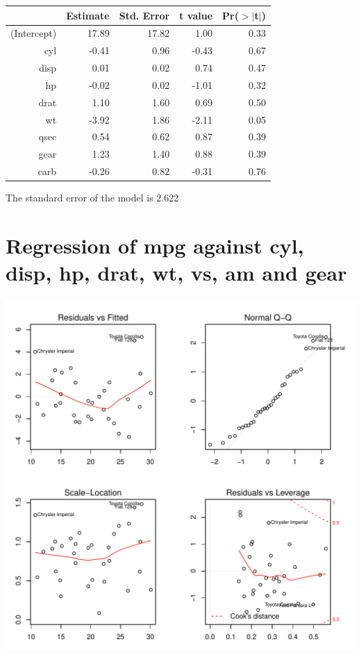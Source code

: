 \documentclass{article}\usepackage[]{graphicx}\usepackage[]{color}
\makeatletter
\def\maxwidth{ %
  \ifdim\Gin@nat@width>\linewidth
    \linewidth
  \else
    \Gin@nat@width
  \fi
}
\newenvironment{knitrout}{}{} %
\makeatother
\begin{document}
\begin{table}[ht]
\centering
\begin{tabular}{rrrrr}
  \hline
 & Estimate & Std. Error & t value & Pr($>$$|$t$|$) \\ 
  \hline
(Intercept) & 17.89 & 17.82 & 1.00 & 0.33 \\ 
  cyl & -0.41 & 0.96 & -0.43 & 0.67 \\ 
  disp & 0.01 & 0.02 & 0.74 & 0.47 \\ 
  hp & -0.02 & 0.02 & -1.01 & 0.32 \\ 
  drat & 1.10 & 1.60 & 0.69 & 0.50 \\ 
  wt & -3.92 & 1.86 & -2.11 & 0.05 \\ 
  qsec & 0.54 & 0.62 & 0.87 & 0.39 \\ 
  gear & 1.23 & 1.40 & 0.88 & 0.39 \\ 
  carb & -0.26 & 0.82 & -0.31 & 0.76 \\ 
   \hline
\end{tabular}
\end{table}




The standard error of the model is 2.622

\newpage

\section{Regression of mpg against cyl, disp, hp, drat, wt, vs, am and gear }
\begin{knitrout}
\color{fgcolor}

{\centering \includegraphics[width=\maxwidth]{figure/lm-cyl-disp-hp-drat-wt-vs-am-gear} 

}



\end{knitrout}
\end{document}
